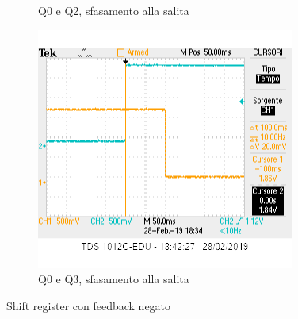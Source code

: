 \documentclass[10pt,a4paper]{article}
\begin{document}
\begin{figure}[h]
\begin{subfigure}[b]{0.4\linewidth}
		\caption{Q0 e Q2, sfasamento alla salita}
	\end{subfigure}
	\begin{subfigure}[b]{0.4\linewidth}
		\includegraphics[width=\linewidth]{q0q3 sr.png}
		\caption{Q0 e Q3, sfasamento alla salita}
	\end{subfigure}
	\caption{Shift register con feedback negato}
\end{figure}
\end{document}
